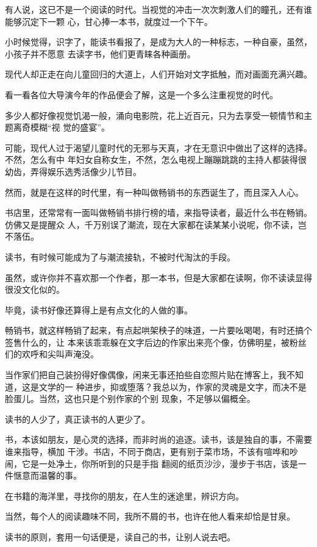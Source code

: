 		有人说，这已不是一个阅读的时代。当视觉的冲击一次次刺激人们的瞳孔，还有谁能够沉定下一颗
	心，甘心捧一本书，就度过一个下午。

		小时候觉得，识字了，能读书看报了，是成为大人的一种标志，一种自豪，虽然，小孩子并不愿意
	去读字书，他们更青睐各种画册。

		现代人却正走在向儿童回归的大道上，人们开始对文字抵触，而对画面充满兴趣。\par
		看一看各位大导演今年的作品便会了解，这是一个多么注重视觉的时代。

		多少人都好像视觉饥渴一般，涌向电影院，花上近百元，只为去享受一顿情节和主题离奇模糊“视
	觉的盛宴”。

		可能，现代人过于渴望儿童时代的无邪与天真，才在无意识中做出了这样的选择。不然，怎么有中
	年妇女自称女生，不然，怎么电视上蹦蹦跳跳的主持人都装得很幼齿，弄得娱乐选秀活像少儿节目。

		然而，就是在这样的时代里，有一种叫做畅销书的东西诞生了，而且深入人心。

		书店里，还常常有一面叫做畅销书排行榜的墙，来指导读者，最近什么书在畅销。仿佛又是提醒众
	人，千万别误了潮流，现在大家都在读某某小说呢，你不读，岂不落伍。

		读书，有时候可能成为了与潮流接轨，不被时代淘汰的手段。\par
		虽然，或许你并不喜欢那一个作者，那一本书，但是大家都在读啊，你不读读显得很没文化似的。\par
		毕竟，读书好像还算得上是有点文化的人做的事。

		畅销书，就这样畅销了起来，有点起哄架秧子的味道，一片要吆喝喝，有时还搞个签售什么的，让
	本来该乖乖躲在文字后边的作家出来亮个像，仿佛明星，被粉丝们的欢呼和尖叫声淹没。

		当作家们把自己装扮得好像偶像，闲来无事还拍些自恋照片贴在博客上，我不知道，这是文学的一
	种进步，抑或堕落？我总以为，作家的灵魂是文字，而决不是脸蛋儿。当然，这也只是个别作家的个别
	现象，不足够以偏概全。

		读书的人少了，真正读书的人更少了。

		书，本该如朋友，是心灵的选择，而非时尚的追逐。读书，该是独自的事，不需要谁来指导，横加
	干涉。书店，不同于商店，更有别于菜市场，不该有喧哗和吵闹，它是一处净土，你所听到的只是手指
	翻阅的纸页沙沙，漫步于书店，该是一件惬意而温馨的事。

		在书籍的海洋里，寻找你的朋友，在人生的迷途里，辨识方向。\par
		当然，每个人的阅读趣味不同，我所不屑的书，也许在他人看来却恰是甘泉。

		读书的原则，套用一句话便是，读自己的书，让别人说去吧。


